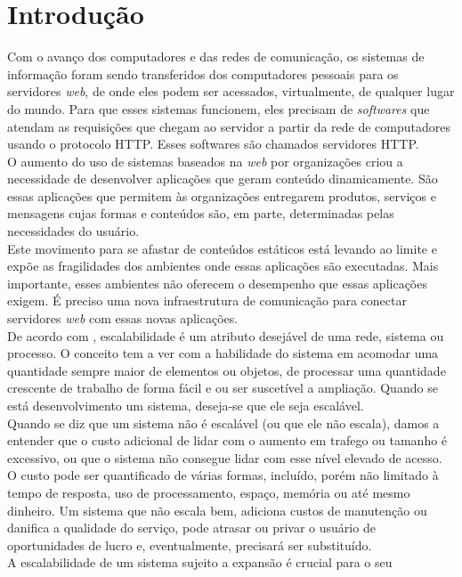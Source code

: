 \chapter{Introdução}\label{cap:introducao}
Com o avanço dos computadores e das redes de comunicação, os sistemas de 
informação foram sendo transferidos dos computadores pessoais para os 
servidores \textit{web}, de onde eles podem ser acessados, virtualmente, de 
qualquer lugar do mundo. Para que esses sistemas funcionem, eles precisam de 
\textit{softwares} que atendam as requisições que chegam ao servidor a partir 
da rede de computadores usando o protocolo HTTP. Esses softwares são chamados 
servidores HTTP.\\
O aumento do uso de sistemas baseados na \textit{web} por organizações criou a 
necessidade de desenvolver aplicações que geram conteúdo dinamicamente. São 
essas aplicações que permitem às organizações entregarem produtos, serviços e 
mensagens cujas formas e conteúdos são, em parte, determinadas pelas 
necessidades do usuário.\\
Este movimento para se afastar de conteúdos estáticos está levando ao limite e 
expõe as fragilidades dos ambientes onde essas aplicações são 
executadas. Mais importante, esses ambientes não oferecem o desempenho que 
essas aplicações exigem. É preciso uma nova infraestrutura de comunicação para 
conectar servidores \textit{web} com essas novas aplicações.\\
De acordo com , escalabilidade é um atributo desejável de 
uma rede, sistema ou processo. O conceito tem a ver com a habilidade do sistema 
em acomodar uma quantidade sempre maior de elementos ou objetos, de processar 
uma quantidade crescente de trabalho de forma fácil e ou ser suscetível a 
ampliação. Quando se está desenvolvimento um sistema, deseja-se que 
ele seja escalável.\\
Quando se diz que um sistema não é escalável (ou que ele não escala), damos a 
entender que o custo adicional de lidar com o aumento em trafego ou tamanho é 
excessivo, ou que o sistema não consegue lidar com esse nível elevado de 
acesso. O custo pode ser quantificado de várias formas, incluído, porém não 
limitado à tempo de resposta, uso de processamento, espaço, memória ou até 
mesmo dinheiro. Um sistema que não escala bem, adiciona custos de manutenção ou 
danifica a qualidade do serviço, pode atrasar ou privar o usuário de 
oportunidades de lucro e, eventualmente, precisará ser substituído.\\
A escalabilidade de um sistema sujeito a expansão é crucial para o seu 
